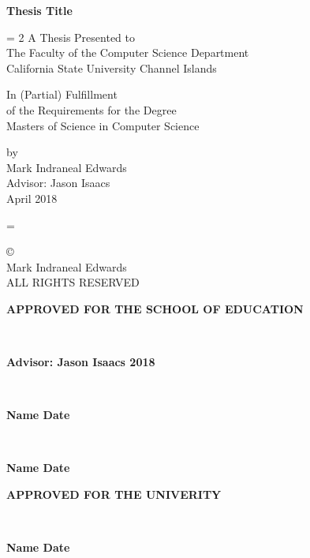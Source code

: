 \documentclass[12pt]{article}
\begin{document}
\begin{titlepage}
\begin{center}
{\Large \bfseries Thesis Title \par}

\vspace{2 cm}
\baselineskip = 2\baselineskip
A Thesis Presented to \\
The Faculty of the Computer Science Department\\
California State University Channel Islands

\vspace{1 cm}

In (Partial) Fulfillment\\
of the Requirements for the Degree\\
Masters of Science in Computer Science\\

\vspace{1 cm }

\vfill

by \\
Mark Indraneal Edwards\\
Advisor: Jason Isaacs\\
April 2018
\end{center}
\end{titlepage}
\baselineskip = \baselineskip

\newpage
\null
\vfill
\begin{flushleft}
\copyright{}\\
Mark Indraneal Edwards\\
ALL RIGHTS RESERVED
\end{flushleft}
\newpage

\begin{center}
{\large \bfseries APPROVED FOR THE SCHOOL OF EDUCATION \par}

\vspace{1.5 cm}

\hrulefill\\
{\large \bfseries Advisor: Jason Isaacs \hfill 2018 \par}

\vspace{1.5 cm}

\hrulefill\\
{\large \bfseries Name \hfill Date \par}

\vspace{1.5 cm}

\hrulefill\\
{\large \bfseries Name \hfill Date \par}

\vspace{3 cm}

{\large \bfseries APPROVED FOR THE UNIVERITY \par}

\vspace{1.5 cm}

\hrulefill\\
{\large \bfseries Name \hfill Date \par}
\end{center}
\end{document}
